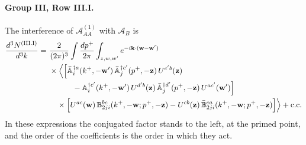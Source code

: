 \paragraph{Group III, Row III.I.} The interference of $\mathcal A^{(1)}_{AA}$ with $\mathcal A_B$ is
\begin{align}\label{eq:rowIII_I}
\frac{d^3N^{\rm(III.I)}}{d^3k}=\ &\frac{2}{(2\pi)^3}\int\frac{dp^+}{2\pi}\int_{z,w,w'}e^{-i\v k\cdot(\v w-\v w')}\notag\\
&\times\Big\langle\Big[\bar{\mf A}^{\dagger a}_i(k^+,-\v w')\,\bar{\mf A}^{\dagger c'}_j(p^+,-\v z)\,U^{c'b}(\v z)\notag\\&\qquad\quad-\mf A^{\dagger c'}_i(k^+,-\v w')\,U^{d'b}(\v z)\,\bar{\mf A}^{\dagger d'}_j(p^+,-\v z)\,U^{ac'}(\v w')\Big]\notag\\
&\quad\times\Big[U^{ac}(\v w)\,\mf B^{bc}_{2ji}(k^+,-\v w;p^+,-\v z)-U^{cb}(\v z)\,\bar{\mf B}^{ca}_{2ji}(k^+,-\v w;p^+,-\v z)\Big]\Big\rangle+{\rm c.c.}
\end{align}
In these expressions the conjugated factor stands to the left, at the primed point, and the order of the coefficients is the order in which they act.

